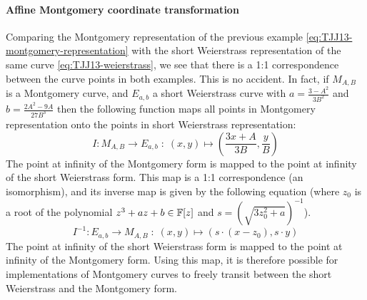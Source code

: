 \paragraph{Affine Montgomery coordinate transformation} Comparing the Montgomery representation of the previous example \ref{eq:TJJ13-montgomery-representation} with the short Weierstrass representation of the same curve \ref{eq:TJJ13-weierstrass}, we see that there is a 1:1 correspondence between the curve points in both examples. This is no accident. In fact, if $M_{A,B}$ is a Montgomery curve, and $E_{a,b}$ a short Weierstrass curve with $a = \frac{3-A^2}{3B^2}$ and $b= \frac{2A^2 -9A}{27B^3}$ then the following function maps all points in Montgomery representation onto the points in short Weierstrass representation:
\begin{equation}
I: M_{A,B} \to E_{a,b}\; : \; (x,y) \mapsto \left(\frac{3x + A}{3B}, \frac{y}{B}\right)
\end{equation}
The point at infinity of the Montgomery form is mapped to the point at infinity of the short Weierstrass form. This map is a 1:1 correspondence (an isomorphism), and its inverse map is given by the following equation (where $z_0$ is a root of the polynomial $z^3 + a z + b \in \mathbb{F}[z]$ and $s=({\sqrt{3z_0^{2}+a}})^{-1}$).
\begin{equation}
I^{-1}: E_{a,b} \to M_{A,B}\; : \; (x,y) \mapsto \left(s\cdot(x-z_0), s\cdot y\right)
\end{equation}
The point at infinity of the short Weierstrass form is mapped to the point at infinity of the Montgomery form. Using this map, it is therefore possible for implementations of Montgomery curves to freely transit between the short Weierstrass and the Montgomery form. 
 
